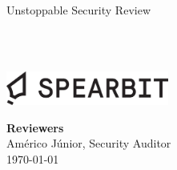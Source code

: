 \begin{titlepage}
  \vbox{}
  \vbox{}

  \begin{center}


    \noindent\makebox[\linewidth]{\rule{.7\paperwidth}{.6pt}}\\[0.7cm]

    { \huge \bfseries

      Unstoppable Security Review
    }\\[0.25cm]
    
    \noindent\makebox[\linewidth]{\rule{.7\paperwidth}{.6pt}}\\[0.7cm]

    
    \vfill

    \includegraphics[width=0.40\textwidth]{img/spearbit_wordmark_black.png}

    
    \large
    {\bfseries Reviewers}\\
    
    Américo Júnior, Security Auditor \\

    {\large \today}

  \end{center}

\end{titlepage}